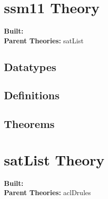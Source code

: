 \documentclass[11pt, twoside]{article}
\begin{document}




\tableofcontents
\cleardoublepage
\HOLpagestyle

\section{ssm11 Theory}
\begin{flushleft}
\textbf{Built:} \HOLssmOneOneDate \\[2pt]
\textbf{Parent Theories:} satList
\end{flushleft}

\subsection{Datatypes}

\HOLssmOneOneDatatypes

\subsection{Definitions}

\HOLssmOneOneDefinitions

\subsection{Theorems}

\HOLssmOneOneTheorems

\section{satList Theory}
\begin{flushleft}
\textbf{Built:} \HOLsatListDate \\[2pt]
\textbf{Parent Theories:} aclDrules
\end{flushleft}
\end{document}
